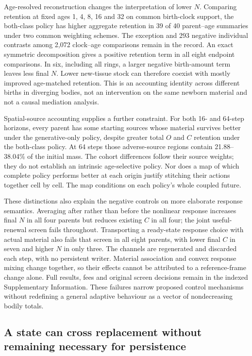 Age-resolved reconstruction changes the interpretation of lower $N$. Comparing retention at fixed ages 1, 4, 8, 16 and 32 on common birth-clock support, the both-class policy has higher aggregate retention in 39 of 40 parent--age summaries under two common weighting schemes. The exception and 293 negative individual contrasts among 2,072 clock--age comparisons remain in the record. An exact symmetric decomposition gives a positive retention term in all eight endpoint comparisons. In six, including all rings, a larger negative birth-amount term leaves less final $N$. Lower new-tissue stock can therefore coexist with mostly improved age-matched retention. This is an accounting identity across different births in diverging bodies, not an intervention on the same newborn material and not a causal mediation analysis.

Spatial-source accounting supplies a further constraint. For both 16- and 64-step horizons, every parent has some starting sources whose material survives better under the generative-only policy, despite greater total $O$ and $C$ retention under the both-class policy. At 64 steps those adverse-source regions contain 21.88--38.04\% of the initial mass. The cohort differences follow their source weights; they do not establish an intrinsic age-selective policy. Nor does a map of which complete policy performs better at each origin justify stitching their actions together cell by cell. The map conditions on each policy's whole coupled future.

These distinctions also explain the negative controls on more elaborate response semantics. Averaging after rather than before the nonlinear response increases final $N$ in all four parents but reduces existing $C$ in all four; the joint useful-renewal screen fails throughout. Transporting a ready-state response choice with actual material also fails that screen in all eight parents, with lower final $C$ in seven and higher $N$ in only three. The channels are regenerated and discarded each step, with no persistent writer. Material association and convex response mixing change together, so their effects cannot be attributed to a reference-frame change alone. Full results, fees and original screen decisions remain in the indexed Supplementary Information. These failures narrow proposed control mechanisms without redefining a general adaptive behaviour as a vector of nondecreasing bodily totals.

\subsection*{A state can cross replacement without remaining necessary for persistence}

